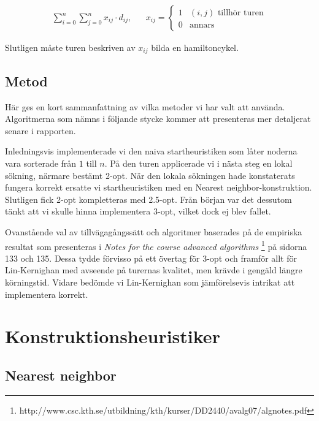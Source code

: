 \documentclass[a4paper,12pt]{article}
\renewcommand{\*}{\ensuremath{\cdot}}
\begin{document}
\begin{align}
    \sum_{i=0}^{n}{\sum_{j=0}^{n}{x_{ij} \cdot d_{ij}}},  & 
    & x_{ij} =
    \begin{cases}
        1 & (i,j) \textrm{ tillhör turen} \\
        0 & \textrm{annars}
    \end{cases}
    \label{eq:tourSum}
\end{align}


Slutligen måste turen beskriven av $x_{ij}$ bilda en hamiltoncykel.

\subsection{Metod}

Här ges en kort sammanfattning av vilka metoder vi har valt att använda.
Algoritmerna som nämns i följande stycke kommer att presenteras mer detaljerat
senare i rapporten.

Inledningsvis implementerade vi den naiva startheuristiken som låter noderna
vara sorterade från $1$ till $n$. På den turen applicerade vi i nästa steg en
lokal sökning, närmare bestämt 2-opt. När den lokala sökningen hade konstaterats
fungera korrekt ersatte vi startheuristiken med en Nearest
neighbor-konstruktion. Slutligen fick 2-opt kompletteras med 2.5-opt. Från
början var det dessutom tänkt att vi skulle hinna implementera 3-opt, vilket
dock ej blev fallet.

Ovanstående val av tillvägagångssätt och algoritmer baserades på de empiriska
resultat som presenteras i \textit{Notes for the course advanced algorithms}
\footnote{http://www.csc.kth.se/utbildning/kth/kurser/DD2440/avalg07/algnotes.pdf}
på sidorna 133 och 135. Dessa tydde förvisso på ett övertag för 3-opt och
framför allt för Lin-Kernighan med avseende på turernas kvalitet, men krävde i
gengäld längre körningstid. Vidare bedömde vi Lin-Kernighan som jämförelsevis
intrikat att implementera korrekt.

\section{Konstruktionsheuristiker}

\subsection{Nearest neighbor}
\end{document}
